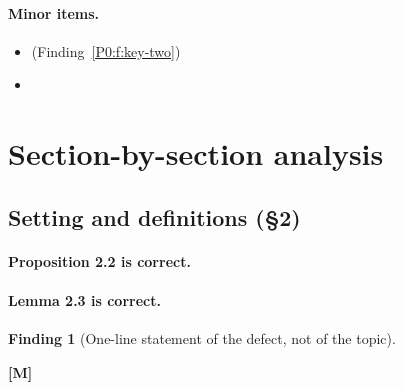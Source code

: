 \documentclass[11pt]{article}
\newcommand{\pk}{P0}
\newif\ifdraftnotes     \draftnotesfalse    %
\newcommand{\defM}{\textbf{[M]}}   %
\theoremstyle{definition}
\newtheorem{finding}{Finding}
\newcommand{\flabel}[1]{\label{\pk:f:#1}}          %
\newcommand{\fref}[1]{Finding~\ref{\pk:f:#1}}      %
\newcommand{\fpref}[1]{(\fref{#1})}
\newcommand{\note}[1]{\ifdraftnotes\textcolor{red}{\small[\,#1\,]}\fi}
\newcommand{\ms}[1]{\S#1}
\begin{document}
\paragraph{Minor items.}
\begin{itemize}
  \item \note{item} \fpref{key-two}
  \item \note{item}
\end{itemize}

\section{Section-by-section analysis}

\subsection{Setting and definitions (\ms{2})}

\paragraph{Proposition 2.2 is correct.} \note{Reproduce the step that matters,
not the whole proof. Say which identities the proof uses and why they hold.}

\paragraph{Lemma 2.3 is correct.} \note{Verdict, then the verification: what was
recomputed, on what instances, with what residual.}

\begin{finding}[One-line statement of the defect, not of the topic]\flabel{key-one}
\note{Quote or paraphrase precisely what the manuscript claims, with its
location. Then state what is actually the case, with the evidence. Then state
the consequence: what breaks, what does not, and what the repair is. A finding
that does not end with a repair is incomplete.}
\defM
\end{finding}
\end{document}
